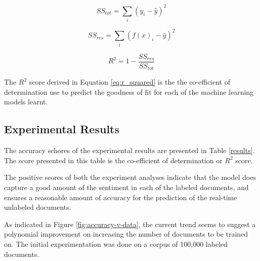 \documentclass[conference]{IEEEtran}
\begin{document}
        \begin{equation}
        \displaystyle SS_{tot} = \sum_{i} (y_i - \hat{y})^2
        \end{equation}

        \begin{equation}
        \displaystyle SS_{res} = \sum_{i} (f(x)_i - \hat{y})^2
        \end{equation}

        \begin{equation} \label{eq:r_squared}
        \displaystyle R^2 = 1 - \frac{SS_{res}}{SS_{tot}}
        \end{equation}

    The $R^2$ score derived in Equation \ref{eq:r_squared} is the the co-efficient of determination use to predict the goodness of fit for each of the machine learning models learnt.


    \subsection{Experimental Results}

    The accuracy schores of the experimental results are presented in Table \ref{results}. The score presented in this table is the co-efficient of determination or $R^2$ score.

    \begin{table}[ht] \caption{Evaluation results} \label{results}
        \centering
    \end{table}

    The positive scores of both the experiment analyses indicate that the model does capture a good amount of the sentiment in each of the labeled documents, and ensures a reasonable amount of accuracy for the prediction of the real-time unlabeled documents.

    As indicated in Figure \ref{fig:accuracy-v-data}, the current trend seems to suggest a polynomial improvement on increasing the number of documents to be trained on. 
    The initial experimentation was done on a corpus of 100,000 labeled documents. 
\end{document}
